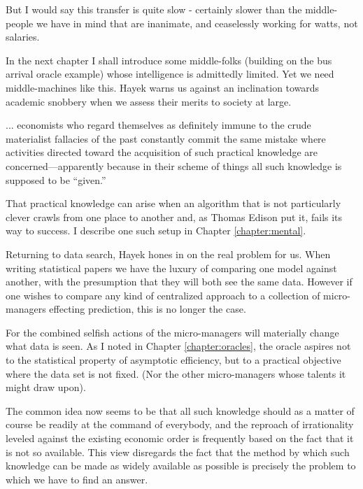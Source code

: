 But I would say this transfer is quite slow - certainly slower than the middle-people we have in mind that are inanimate, and ceaselessly working for watts, not salaries. 

In the next chapter I shall introduce some middle-folks (building on the bus arrival oracle example) whose intelligence is admittedly limited. Yet we need middle-machines like this. Hayek warns us against an inclination towards academic snobbery when we assess their merits to society at large.  

\begin{oldquote}
      ... economists who regard themselves as definitely immune to the crude materialist fallacies of the past constantly commit the same mistake where activities directed toward the acquisition of such practical knowledge are concerned—apparently because in their scheme of things all such knowledge is supposed to be “given.” 
\end{oldquote}

That practical knowledge can arise when an algorithm that is not particularly clever crawls from one place to another and, as Thomas Edison put it, fails its way to success. I describe one such setup in Chapter \ref{chapter:mental}.

Returning to data search, Hayek hones in on the real problem for us. When writing statistical papers we have the luxury of comparing one model against another, with the presumption that they will both see the same data. However if one wishes to compare any kind of centralized approach to a collection of micro-managers effecting prediction, this is no longer the case. 


For the combined selfish actions of the micro-managers will materially change what data is seen. As I noted in Chapter \ref{chapter:oracles}, the oracle aspires not to the statistical property of asymptotic efficiency, but to a practical objective where the data set is not fixed. (Nor the other micro-managers whose talents it might draw upon). 

\begin{oldquote}
The common idea now seems to be that all such knowledge should as a matter of course be readily at the command of everybody, and the reproach of irrationality leveled against the existing economic order is frequently based on the fact that it is not so available. This view disregards the fact that the method by which such knowledge can be made as widely available as possible is precisely the problem to which we have to find an answer.
\end{oldquote}

